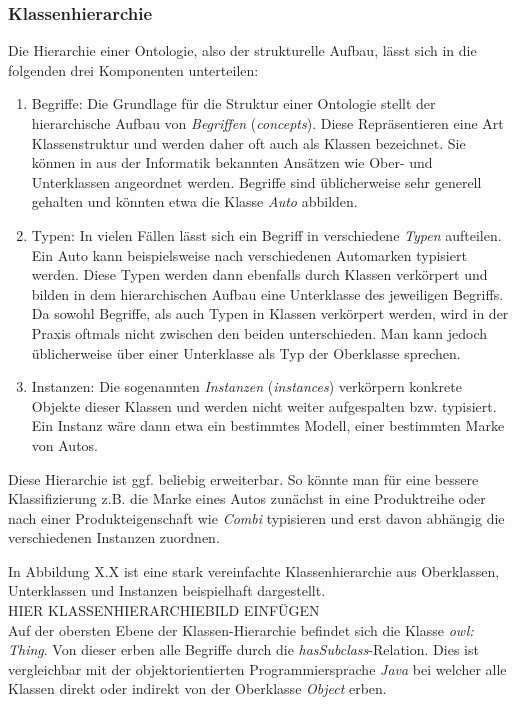 \documentclass[12pt]{report}
\begin{document}
\subsubsection{Klassenhierarchie}
Die Hierarchie einer Ontologie, also der strukturelle Aufbau, lässt sich in die folgenden drei Komponenten unterteilen:
\begin{enumerate}
\item Begriffe: Die Grundlage für die Struktur einer Ontologie stellt der hierarchische Aufbau von \textit{Begriffen} (\textit{concepts}). Diese Repräsentieren eine Art Klassenstruktur und werden daher oft auch als Klassen bezeichnet. Sie können in aus der Informatik bekannten Ansätzen wie Ober- und Unterklassen angeordnet werden. Begriffe sind üblicherweise sehr generell gehalten und könnten etwa die Klasse \textit{Auto} abbilden. 

\item Typen: In vielen Fällen lässt sich ein Begriff in verschiedene \textit{Typen} aufteilen. Ein Auto kann beispielsweise nach verschiedenen Automarken typisiert werden. Diese Typen werden dann ebenfalls durch Klassen verkörpert und bilden in dem hierarchischen Aufbau eine Unterklasse des jeweiligen Begriffs. Da sowohl Begriffe, als auch Typen in Klassen verkörpert werden, wird in der Praxis oftmals nicht zwischen den beiden unterschieden. Man kann jedoch üblicherweise über einer Unterklasse als Typ der Oberklasse sprechen. 

\item Instanzen: Die sogenannten \textit{Instanzen} (\textit{instances}) verkörpern konkrete Objekte dieser Klassen und werden nicht weiter aufgespalten bzw. typisiert. Ein Instanz wäre dann etwa ein bestimmtes Modell, einer bestimmten Marke von Autos. 
\end{enumerate}

Diese Hierarchie ist ggf. beliebig erweiterbar. So könnte man für eine bessere Klassifizierung z.B. die Marke eines Autos zunächst in eine Produktreihe oder nach einer Produkteigenschaft wie \textit{Combi} typisieren und erst davon abhängig die verschiedenen Instanzen zuordnen.

In Abbildung X.X ist eine stark vereinfachte Klassenhierarchie aus Oberklassen, Unterklassen und Instanzen beispielhaft dargestellt. 
\\
\newline
HIER KLASSENHIERARCHIEBILD EINFÜGEN
\\
\newline
Auf der obersten Ebene der Klassen-Hierarchie befindet sich die Klasse \textit{owl: Thing}. Von dieser erben alle Begriffe durch die \textit{hasSubclass}-Relation. Dies ist vergleichbar mit der objektorientierten Programmiersprache \textit{Java} bei welcher alle Klassen direkt oder indirekt von der Oberklasse \textit{Object} erben. 
\end{document}
